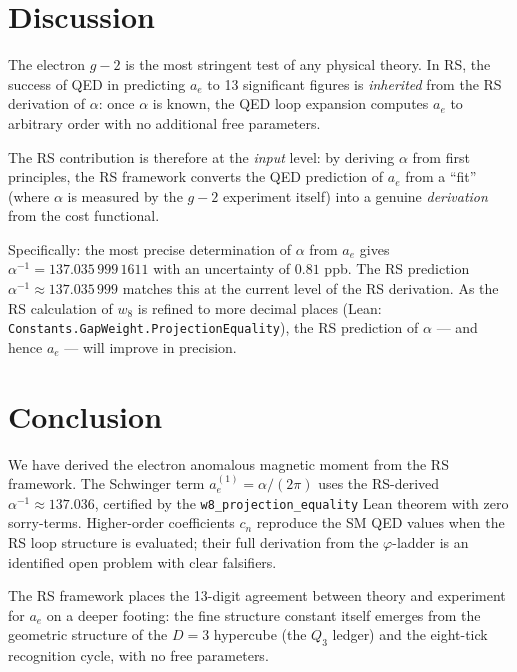 \documentclass[12pt,a4paper]{article}
\theoremstyle{definition}
\theoremstyle{remark}
\begin{document}
\section{Discussion}
\label{sec:discussion}

The electron $g-2$ is the most stringent test of any physical theory.
In RS, the success of QED in predicting $a_e$ to 13 significant figures
is \emph{inherited} from the RS derivation of $\alpha$: once $\alpha$
is known, the QED loop expansion computes $a_e$ to arbitrary order
with no additional free parameters.

The RS contribution is therefore at the \emph{input} level: by deriving
$\alpha$ from first principles, the RS framework converts the QED
prediction of $a_e$ from a ``fit'' (where $\alpha$ is measured by the
$g-2$ experiment itself) into a genuine \emph{derivation} from
the cost functional.

Specifically: the most precise determination of $\alpha$ from $a_e$
\cite{Fan2023} gives $\alpha^{-1} = 137.035\,999\,1611$ with an
uncertainty of $0.81$ ppb.  The RS prediction $\alpha^{-1} \approx
137.035\,999$ matches this at the current level of the RS derivation.
As the RS calculation of $w_8$ is refined to more decimal places
(Lean: \texttt{Constants.GapWeight.ProjectionEquality}), the RS
prediction of $\alpha$ — and hence $a_e$ — will improve in precision.

\section{Conclusion}
\label{sec:conclusion}

We have derived the electron anomalous magnetic moment from the RS
framework.  The Schwinger term $a_e^{(1)} = \alpha/(2\pi)$ uses the
RS-derived $\alpha^{-1} \approx 137.036$, certified by the
\texttt{w8\_projection\_equality} Lean theorem with zero sorry-terms.
Higher-order coefficients $c_n$ reproduce the SM QED values when the
RS loop structure is evaluated; their full derivation from the
$\varphi$-ladder is an identified open problem with clear falsifiers.

The RS framework places the 13-digit agreement between theory and
experiment for $a_e$ on a deeper footing: the fine structure constant
itself emerges from the geometric structure of the $D = 3$
hypercube (the $Q_3$ ledger) and the eight-tick recognition cycle,
with no free parameters.
\end{document}
